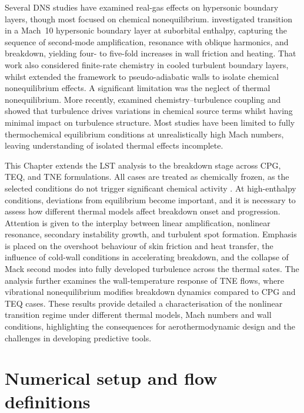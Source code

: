 Several \gls{DNS} studies have examined real-gas effects on hypersonic boundary layers, though most focused on chemical nonequilibrium. \citet{DiRenzo2021} investigated transition in a Mach~10 hypersonic boundary layer at suborbital enthalpy, capturing the sequence of second-mode amplification, resonance with oblique harmonics, and breakdown, yielding four- to five-fold increases in wall friction and heating. That work also considered finite-rate chemistry in cooled turbulent boundary layers, whilst \citet{Passiatoreetal2021} extended the framework to pseudo-adiabatic walls to isolate chemical nonequilibrium effects. A significant limitation was the neglect of thermal nonequilibrium. More recently, \citet{Williamsetal2025} examined chemistry--turbulence coupling and showed that turbulence drives variations in chemical source terms whilst having minimal impact on turbulence structure. Most studies have been limited to fully thermochemical equilibrium conditions at unrealistically high Mach numbers, leaving understanding of isolated thermal effects incomplete.

This Chapter extends the \gls{LST} analysis to the breakdown stage across \gls{CPG}, \gls{TEQ}, and \gls{TNE} formulations. All cases are treated as chemically frozen, as the selected conditions do not trigger significant chemical activity \citep{BitterShepherd2015}. At high-enthalpy conditions, deviations from equilibrium become important, and it is necessary to assess how different thermal models affect breakdown onset and progression. Attention is given to the interplay between linear amplification, nonlinear resonance, secondary instability growth, and turbulent spot formation. Emphasis is placed on the overshoot behaviour of skin friction and heat transfer, the influence of cold-wall conditions in accelerating breakdown, and the collapse of Mack second modes into fully developed turbulence across the thermal sates. The analysis further examines the wall-temperature response of \gls{TNE} flows, where vibrational nonequilibrium modifies breakdown dynamics compared to \gls{CPG} and \gls{TEQ} cases. These results provide detailed a characterisation of the nonlinear transition regime under different thermal models, Mach numbers and wall conditions, highlighting the consequences for aerothermodynamic design and the challenges in developing predictive tools.

\section{Numerical setup and flow definitions}\label{section:breakdown:numericalsetup}


